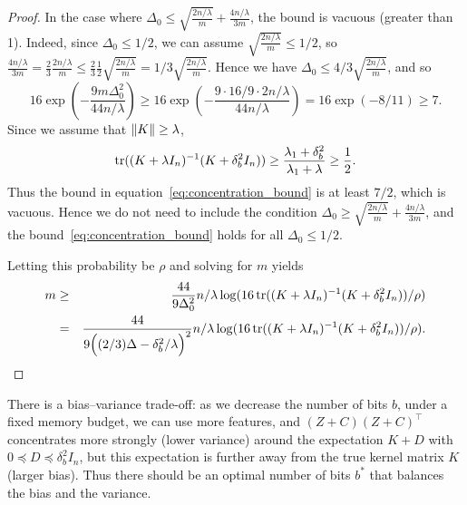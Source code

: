 \begin{proof}
In the case where $\Delta_0 \leq \sqrt{\frac{2n/\lambda}{m}} + \frac{4n/\lambda}{3m}$, the bound is
vacuous (greater than 1).
Indeed, since $\Delta_0 \leq 1/2$, we can assume $\sqrt{\frac{2n/\lambda}{m}} \leq 1/2$, so
$\frac{4n/\lambda}{3m} = \frac{2}{3} \frac{2n/\lambda}{m} \leq \frac{2}{3} \frac{1}{2}
\sqrt{\frac{2n/\lambda}{m}} = 1/3 \sqrt{\frac{2n/\lambda}{m}}$.
Hence we have $\Delta_0 \leq 4/3 \sqrt{\frac{2n/\lambda}{m}}$, and so
\begin{equation*}
  16 \exp \left( -\frac{9m \Delta_0^2}{44 n/\lambda} \right) \geq 16 \exp \left( -\frac{9 \cdot
      16/9 \cdot 2n/\lambda}{44 n/\lambda} \right) = 16 \exp(-8/11) \geq 7.
\end{equation*}
Since we assume that $\|K\| \geq \lambda$,
\begin{equation*}
  \mathop{\rm tr} ((K + \lambda I_n)^{-1} (K + \delta^2_b I_n)) \geq \frac{\lambda_1 + \delta^2_b}{\lambda_1 + \lambda} \geq \frac{1}{2}.
\end{equation*}
Thus the bound in equation~\eqref{eq:concentration_bound} is at least $7/2$,
which is vacuous.
Hence we do not need to include the condition $\Delta_0 \geq \sqrt{\frac{2n/\lambda}{m}} +
\frac{4n/\lambda}{3m}$,
and the bound~\eqref{eq:concentration_bound} holds for all $\Delta_0 \leq 1/2$.

Letting this probability be $\rho$ and solving for $m$ yields
\begin{eqnarray*}
m &\geq& \frac{44}{9 \Delta_0^2} n/\lambda \log (16 \mathop{\rm tr}((K + \lambda I_n)^{-1} (K + \delta^2_b I_n)) / \rho) \\
&=& \frac{44}{9 \Big((2/3)\Delta - \delta_b^2/\lambda\Big)^2} n/\lambda \log (16 \mathop{\rm tr}((K + \lambda I_n)^{-1} (K + \delta^2_b I_n)) / \rho).
\end{eqnarray*}

\end{proof}

There is a bias--variance trade-off: as we decrease the number of bits $b$, under
a fixed memory budget, we can use more features, and $(Z + C)(Z + C)^\top$
concentrates more strongly (lower variance) around the expectation $K + D$ with
$0 \preceq D \preceq \delta^2_b I_n$, but this expectation is further away from the true kernel
matrix $K$ (larger bias).
Thus there should be an optimal number of bits $b^*$ that balances the bias and
the variance.

